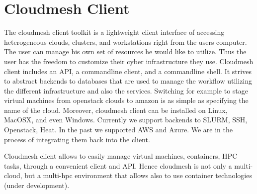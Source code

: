 \section{Cloudmesh Client}
\label{S:cmclient}

The cloudmesh client toolkit is a lightweight client interface of
accessing heterogeneous clouds, clusters, and workstations right from
the users computer. The user can manage his own set of resources he
would like to utilize. Thus the user has the freedom to customize
their cyber infrastructure they use. Cloudmesh client includes an API,
a commandline client, and a commandline shell. It strives to abstract
backends to databases that are used to manage the workflow utilizing
the different infrastructure and also the services. Switching for
example to stage virtual machines from openstack clouds to amazon is
as simple as specifying the name of the cloud. Moreover, cloudmesh
client can be installed on Linux, MacOSX, and even Windows. Currently
we support backends to SLURM, SSH, Openstack, Heat. In the past we
supported AWS and Azure. We are in the process of integrating them
back into the client.


Cloudmesh client allows to easily manage virtual machines, containers,
HPC tasks, through a convenient client and API. Hence cloudmesh is not
only a multi-cloud, but a multi-hpc environment that allows also to
use container technologies (under development).

